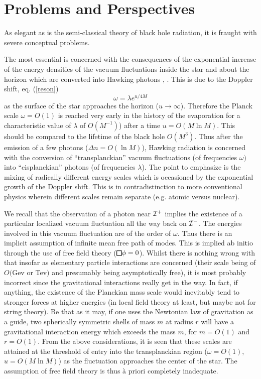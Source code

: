\documentclass[12pt,oneside]{report}
\def\sqr#1#2{{\vcenter{\vbox{\hrule height.#2pt
          \hbox{\vrule width.#2pt height#1pt \kern#1pt
           \vrule width.#2pt}
           \hrule height.#2pt}}}}
\def\square{\mathchoice\sqr68\sqr68\sqr{4.2}6\sqr{3}6}
\def\om{\omega	}
\def\la{\lambda}
\begin{document}




\section{Problems and
Perspectives}\label{troub}

As elegant as is the semi-classical theory of black hole 
radiation, it is fraught with severe conceptual problems.

The most essential 
is concerned with 
the consequences of the exponential increase of
the energy densities of the vacuum fluctuations inside
the star and about the horizon which are converted into
Hawking photons \cite{THooft}, \cite{Jacobson1}. 
This is due to the Doppler shift,
eq. (\ref{reson})
\begin{equation}
\omega
= \lambda e^{u/4M}
\label{reso}
\end{equation}
as the surface of the star approaches the horizon ($u \to
\infty$). Therefore the Planck scale $\omega=O(1)$ 
 is reached very early in the history of the evaporation
for a 
characteristic value of $\la$ of $O(M^{-1})$) 
after a time $u = O(M \ln M)$. This should be compared to the
lifetime of the black hole $O(M^3)$. 
Thus after the emission of a few
photons ($\Delta n = O(\ln M)$), Hawking radiation is
concerned with the conversion of ``transplanckian''
vacuum fluctuations (of frequencies $\omega)$
into ``cisplanckian'' photons (of frequencies $\la$).
 The point to emphasize is the mixing of radically different
energy scales which is occasioned by 
the exponential growth of the
Doppler shift. This is
in contradistinction  to more conventional physics 
wherein different scales remain separate 
(e.g. atomic versus nuclear).

We recall that the observation of a photon near
${\cal I}^+$ implies the existence of a particular
localized vacuum fluctuation all the way back on ${\cal
I}^-$. The energies involved in this  vacuum fluctuation
are of the order of $\omega$.
 Thus there is an implicit assumption of infinite
mean free path of modes. This is implied ab initio
through the use of free field theory ($\square \phi =
0$). Whilst there is nothing wrong with that insofar as
elementary particle interactions are concerned (their
scale being of $O($Gev or Tev$)$ and presumably
being asymptotically free), 
 it is most probably incorrect since the gravitational
interactions really get in the way. In fact, if anything,
the existence of the Planckian mass scale would inevitably
tend to
stronger forces at higher energies (in local field theory at least,
but maybe not for string theory). 
Be that as it may, if
one uses the Newtonian law of gravitation as a guide, two
spherically symmetric shells of mass $m$ at radius $r$
will have a gravitational interaction energy which
exceeds the mass $m$, for $m=O(1)$ and $r =O( 1)$. From
the above considerations, 
it is seen that these scales are attained
at the threshold of entry into the transplanckian region ($\om=O(1)$, 
$u=O(M\ln M)$)
as the fluctuation approaches the center of the star. The
assumption of free field theory is thus \`a priori
completely inadequate.
\end{document}
